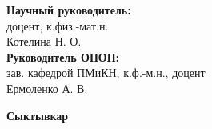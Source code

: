 \noindent
{\bfseries\fontsize{12pt}{14pt}\selectfont Научный руководитель:}\\
{\fontsize{12pt}{14pt}\selectfont доцент, к.физ.-мат.н.}\\
{\fontsize{12pt}{14pt}\selectfont Котелина Н. О. \underline{\hspace{6cm}}}\\

\noindent
{\bfseries\fontsize{12pt}{14pt}\selectfont Руководитель ОПОП:}\\
{\fontsize{12pt}{14pt}\selectfont зав. кафедрой ПМиКН, к.ф.-м.н., доцент}\\
{\fontsize{12pt}{14pt}\selectfont Ермоленко А. В. \underline{\hspace{6cm}}}\\

\begin{center}
	{\bfseries\fontsize{12pt}{14pt}\selectfont Сыктывкар}\\[0.1cm]
	{\bfseries\fontsize{12pt}{14pt}\selectfont \the\year}
\end{center}

\restoregeometry